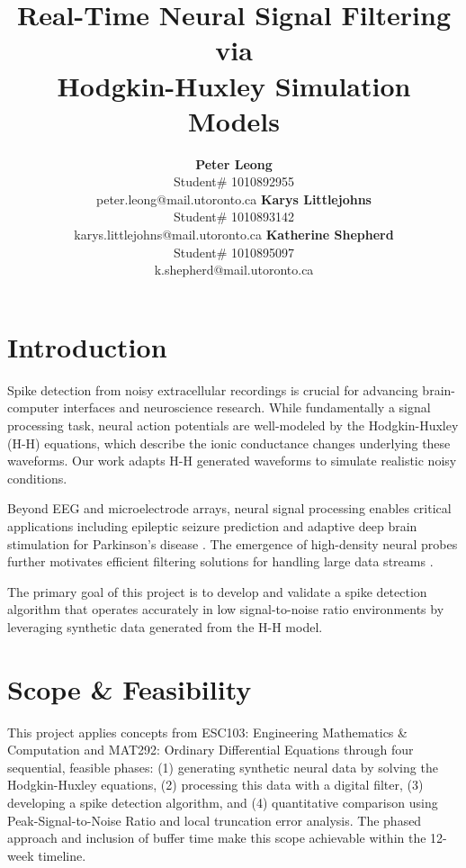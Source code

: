 \documentclass{article} %
\title{Real-Time Neural Signal Filtering via \\
Hodgkin-Huxley Simulation Models}
\author{\textbf{Peter Leong} \\
    Student\# 1010892955 \\
    peter.leong@mail.utoronto.ca
\And
    \textbf{Karys Littlejohns} \\
    Student\# 1010893142 \\
    karys.littlejohns@mail.utoronto.ca
\And
    \textbf{Katherine Shepherd} \\
    Student\# 1010895097 \\
    k.shepherd@mail.utoronto.ca
}
\begin{document}
\maketitle





\vspace{2ex}

\begin{multicols}{2}

\section{Introduction}
\label{sec:introduction}
Spike detection from noisy extracellular recordings is crucial for advancing brain-computer interfaces and neuroscience research. While fundamentally a signal processing task, neural action potentials are well-modeled by the Hodgkin-Huxley (H-H) equations, which describe the ionic conductance changes underlying these waveforms. 
Our work adapts H-H generated waveforms to simulate realistic noisy conditions.

Beyond EEG and microelectrode arrays, neural signal processing enables critical applications including epileptic seizure prediction \citep{addai-domfe2024epileptic} and adaptive deep brain stimulation for Parkinson's disease \citep{aljalal2022parkinson}. 
The emergence of high-density neural probes further motivates efficient filtering solutions for handling large data streams \citep{ye2024ultra}. 

The primary goal of this project is to develop and validate a spike detection algorithm that operates accurately in low signal-to-noise ratio environments by leveraging synthetic data generated from the H-H model.

\section{Scope \& Feasibility}
\label{sec:scope_feasibility}

This project applies concepts from ESC103: Engineering Mathematics \& Computation and MAT292: Ordinary Differential Equations through four sequential, feasible phases:
(1) generating synthetic neural data by solving the Hodgkin-Huxley equations,
(2) processing this data with a digital filter,
(3) developing a spike detection algorithm, and
(4) quantitative comparison using Peak-Signal-to-Noise Ratio and local truncation error analysis.
The phased approach and inclusion of buffer time make this scope achievable within the 12-week timeline.


\end{multicols}
\end{document}

